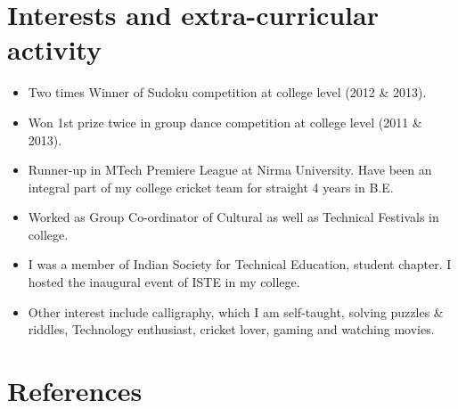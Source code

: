 \documentclass[11pt,a4paper,sans]{moderncv}        %
\begin{document}
\section{Interests and extra-curricular activity}

\vspace{8pt}

\begin{itemize}

\item{Two times Winner of Sudoku competition at college level (2012 \& 2013).}

\vspace{8pt}

\item{Won 1st prize twice in group dance competition at college level (2011 \& 2013).}

\vspace{8pt}

\item{Runner-up in MTech Premiere League at Nirma University. Have been an integral part of my college cricket team for straight 4 years in B.E.}

\vspace{8pt}

\item{Worked as Group Co-ordinator of Cultural as well as Technical Festivals in college.}

\vspace{8pt}

\item{I was a member of Indian Society for Technical Education, student chapter. I hosted the inaugural event of ISTE in my college.}

\vspace{8pt}

\item{Other interest include calligraphy, which I am self-taught, solving puzzles \& riddles, Technology enthusiast, cricket lover, gaming and watching movies.}

\end{itemize}

\section{References}
\end{document}
